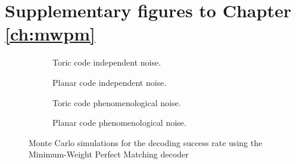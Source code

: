 \chapter{Supplementary figures to Chapter \ref{ch:mwpm}}\label{ap:figmwpm}

\begin{figure}[htbp]
    \centering
    \begin{subfigure}[b]{0.49\textwidth}
      \begin{adjustbox}{Clip=0 1em 0 0}
        
      \end{adjustbox}
      \caption{Toric code independent noise.}
    \end{subfigure}
    \begin{subfigure}[b]{0.49\textwidth}
      \begin{adjustbox}{Clip=0 1em 0 0}
        
      \end{adjustbox}
      \caption{Planar code independent noise.}
    \end{subfigure}
    \begin{subfigure}[b]{0.49\textwidth}
      \begin{adjustbox}{Clip=0 1em 0 0}
        
      \end{adjustbox}
      \caption{Toric code phenomenological noise.}
    \end{subfigure}
    \begin{subfigure}[b]{0.49\textwidth}
      \begin{adjustbox}{Clip=0 1em 0 0}
        
      \end{adjustbox}
      \caption{Planar code phenomenological noise.}
    \end{subfigure}
    \caption{Monte Carlo simulations for the decoding success rate using the Minimum-Weight Perfect Matching decoder}
    \label{fig:threshold_mwpm}
  \end{figure}
